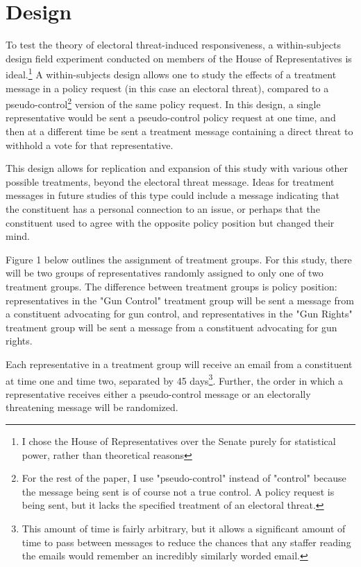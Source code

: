 \documentclass[12pt]{article}
\begin{document}
\section{Design}
To test the theory of electoral threat-induced responsiveness, a within-subjects design field experiment conducted on members of the House of Representatives is ideal.\footnote{I chose the House of Representatives over the Senate purely for statistical power, rather than theoretical reasons} A within-subjects design allows one to study the effects of a treatment message in a policy request (in this case an electoral threat), compared to a pseudo-control\footnote{For the rest of the paper, I use "pseudo-control" instead of "control" because the message being sent is of course not a true control. A policy request is being sent, but it lacks the specified treatment of an electoral threat.} version of the same policy request. In this design, a single representative would be sent a pseudo-control policy request at one time, and then at a different time be sent a treatment message containing a direct threat to withhold a vote for that representative.

This design allows for replication and expansion of this study with various other possible treatments, beyond the electoral threat message. Ideas for treatment messages in future studies of this type could include a message indicating that the constituent has a personal connection to an issue, or perhaps that the constituent used to agree with the opposite policy position but changed their mind.

Figure 1 below outlines the assignment of treatment groups. For this study, there will be two groups of representatives randomly assigned to only one of two treatment groups. The difference between treatment groups is policy position: representatives in the "Gun Control" treatment group will be sent a message from a constituent advocating for gun control, and representatives in the "Gun Rights" treatment group will be sent a message from a constituent advocating for gun rights.

Each representative in a treatment group will receive an email from a constituent at time one and time two, separated by 45 days\footnote{This amount of time is fairly arbitrary, but it allows a significant amount of time to pass between messages to reduce the chances that any staffer reading the emails would remember an incredibly similarly worded email.}. Further, the order in which a representative receives either a pseudo-control message or an electorally threatening message will be randomized.
\end{document}
